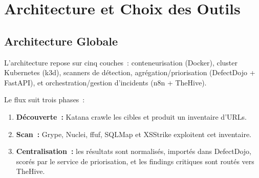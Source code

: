 \documentclass[12pt,a4paper]{report}
\begin{document}
\chapter{Architecture et Choix des Outils}

\section{Architecture Globale}
L'architecture repose sur cinq couches~: conteneurisation (Docker), cluster Kubernetes (k3d), scanners de détection, agrégation/priorisation (DefectDojo + FastAPI), et orchestration/gestion d'incidents (n8n + TheHive).

Le flux suit trois phases~:
\begin{enumerate}[nosep]
    \item \textbf{Découverte~:} Katana crawle les cibles et produit un inventaire d'URLs.
    \item \textbf{Scan~:} Grype, Nuclei, ffuf, SQLMap et XSStrike exploitent cet inventaire.
    \item \textbf{Centralisation~:} les résultats sont normalisés, importés dans DefectDojo, scorés par le service de priorisation, et les findings critiques sont routés vers TheHive.
\end{enumerate}
\end{document}
